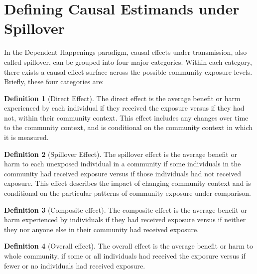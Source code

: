 \documentclass{article}
\theoremstyle{definition}
\newtheorem{definition}{Definition}[section]
\begin{document}
\section{Defining Causal Estimands under Spillover}
In the Dependent Happenings paradigm, causal effects under transmission, also called spillover, can be grouped into four major categories. Within each category, there exists a causal effect surface across the possible community exposure levels. Briefly, these four categories are:
\begin{definition}[Direct Effect]The direct effect is the average benefit or harm experienced by each individual if they received the exposure versus if they had not, within their community context. This effect includes any changes over time to the community context, and is conditional on the community context in which it is measured. 
\end{definition}
\begin{definition}[Spillover Effect] The spillover effect is the average benefit or harm to each unexposed individual in a community if some individuals in the community had received exposure versus if those individuals had not received exposure. This effect describes the impact of changing community context and is conditional on the particular patterns of community exposure under comparison.
\end{definition}
\begin{definition}[Composite effect]The composite effect is the average benefit or harm experienced by individuals if they had received exposure versus if neither they nor anyone else in their community had received exposure.
\end{definition}
\begin{definition}[Overall effect] The overall effect is the average benefit or harm to whole community, if some or all individuals had received the exposure versus if fewer or no individuals had received exposure. 
\end{definition}
\end{document}
